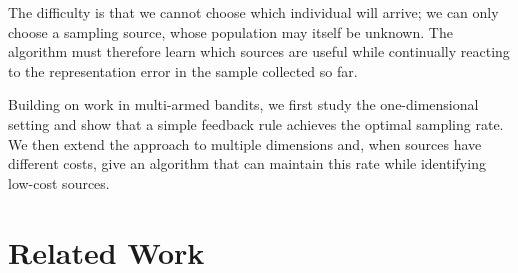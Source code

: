 \documentclass[twoside]{article}
\begin{document}


The difficulty is that we cannot choose which individual will arrive; we can only choose a sampling source, whose population may itself be unknown. The algorithm must therefore learn which sources are useful while continually reacting to the representation error in the sample collected so far.

Building on work in multi-armed bandits, we first study the one-dimensional setting and show that a simple feedback rule achieves the optimal sampling rate. We then extend the approach to multiple dimensions and, when sources have different costs, give an algorithm that can maintain this rate while identifying low-cost sources.














\section{Related Work}
\end{document}
